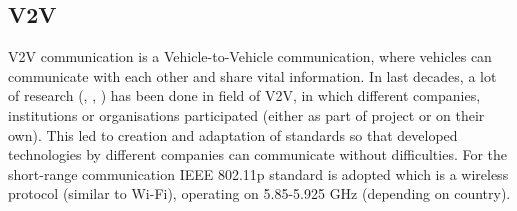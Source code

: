 \subsection{V2V}

V2V communication is a Vehicle-to-Vehicle communication, where vehicles can communicate with each other and share vital information. In last decades, a lot of research (\cite{Chan2012ProjectSARTRE}, \cite{Safespot}, \cite{2016CompanionProject}) has been done in field of V2V, in which different companies, institutions or organisations participated (either as part of project or on their own). This led to creation and adaptation of standards so that developed technologies by different companies can communicate without difficulties. For the short-range communication IEEE 802.11p standard is adopted which is a wireless protocol (similar to Wi-Fi), operating on 5.85-5.925 GHz (depending on country).









